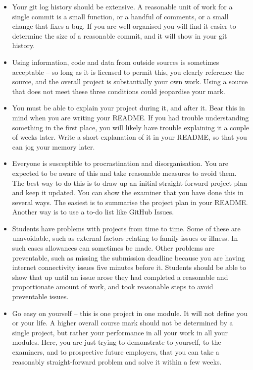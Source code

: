 \documentclass[12pt, a4paper]{article}
\begin{document}
\begin{itemize}
    \item
    Your git log history should be extensive.
    A reasonable unit of work for a single commit is a small function, or a handful of comments, or a small change that fixes a bug.
    If you are well organised you will find it easier to determine the size of a reasonable commit, and it will show in your git history.
    \item
    Using information, code and data from outside sources is sometimes acceptable -- so long as it is licensed to permit this, you clearly reference the source, and the overall project is substantially your own work.
    Using a source that does not meet these three conditions could jeopardise your mark.
    \item
    You must be able to explain your project during it, and after it.
    Bear this in mind when you are writing your README.
    If you had trouble understanding something in the first place, you will likely have trouble explaining it a couple of weeks later.
    Write a short explanation of it in your README, so that you can jog your memory later.
    \item
    Everyone is susceptible to procrastination and disorganisation.
    You are expected to be aware of this and take reasonable measures to avoid them.
    The best way to do this is to draw up an initial straight-forward project plan and keep it updated.
    You can show the examiner that you have done this in several ways.
    The easiest is to summarise the project plan in your README.
    Another way is to use a to-do list like GitHub Issues.
    \item
    Students have problems with projects from time to time.
    Some of these are unavoidable, such as external factors relating to family issues or illness.
    In such cases allowances can sometimes be made.
    Other problems are preventable, such as missing the submission deadline because you are having internet connectivity issues five minutes before it.
    Students should be able to show that up until an issue arose they had completed a reasonable and proportionate amount of work, and took reasonable steps to avoid preventable issues.
    \item
    Go easy on yourself -- this is one project in one module.
    It will not define you or your life.
    A higher overall course mark should not be determined by a single project, but rather your performance in all your work in all your modules.
    Here, you are just trying to demonstrate to yourself, to the examiners, and to prospective future employers, that you can take a reasonably straight-forward problem and solve it within a few weeks.
\end{itemize}




\end{document}
